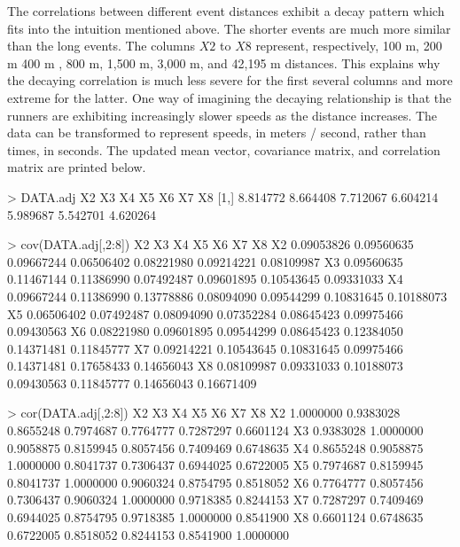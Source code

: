 \documentclass[oneside,12pt,letterpaper]{article}
\begin{document}
\begin{enumerate}
\begin{rc}
			\end{rc}

			The correlations between different event distances exhibit a decay pattern which fits into the intuition mentioned above. The shorter events are much more similar than the long events. The columns $X2$ to $X8$ represent, respectively, 100 m, 200 m 400 m , 800 m, 1,500 m, 3,000 m, and 42,195 m distances. This explains why the decaying correlation is much less severe for the first several columns and more extreme for the latter. One way of imagining the decaying relationship is that the runners are exhibiting increasingly slower speeds as the distance increases. The data can be transformed to represent speeds, in meters / second, rather than times, in seconds. The updated mean vector, covariance matrix, and correlation matrix are printed below. \newline
			\begin{rc}
	> DATA.adj %
		X2       X3       X4       X5       X6       X7       X8
	[1,] 8.814772 8.664408 7.712067 6.604214 5.989687 5.542701 4.620264

	> cov(DATA.adj[,2:8])
	  X2         X3         X4         X5         X6         X7         X8
	X2 0.09053826 0.09560635 0.09667244 0.06506402 0.08221980 0.09214221 0.08109987
	X3 0.09560635 0.11467144 0.11386990 0.07492487 0.09601895 0.10543645 0.09331033
	X4 0.09667244 0.11386990 0.13778886 0.08094090 0.09544299 0.10831645 0.10188073
	X5 0.06506402 0.07492487 0.08094090 0.07352284 0.08645423 0.09975466 0.09430563
	X6 0.08221980 0.09601895 0.09544299 0.08645423 0.12384050 0.14371481 0.11845777
	X7 0.09214221 0.10543645 0.10831645 0.09975466 0.14371481 0.17658433 0.14656043
	X8 0.08109987 0.09331033 0.10188073 0.09430563 0.11845777 0.14656043 0.16671409

	> cor(DATA.adj[,2:8])
	  X2        X3        X4        X5        X6        X7        X8
	X2 1.0000000 0.9383028 0.8655248 0.7974687 0.7764777 0.7287297 0.6601124
	X3 0.9383028 1.0000000 0.9058875 0.8159945 0.8057456 0.7409469 0.6748635
	X4 0.8655248 0.9058875 1.0000000 0.8041737 0.7306437 0.6944025 0.6722005
	X5 0.7974687 0.8159945 0.8041737 1.0000000 0.9060324 0.8754795 0.8518052
	X6 0.7764777 0.8057456 0.7306437 0.9060324 1.0000000 0.9718385 0.8244153
	X7 0.7287297 0.7409469 0.6944025 0.8754795 0.9718385 1.0000000 0.8541900
	X8 0.6601124 0.6748635 0.6722005 0.8518052 0.8244153 0.8541900 1.0000000

			\end{rc}


\end{enumerate}
\end{document}
